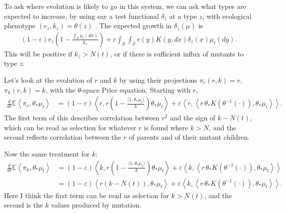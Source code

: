 \documentclass[11pt]{amsart}
\theoremstyle{remark}
\theoremstyle{definition}
\begin{document}
To ask where evolution is likely to go in this system, we can ask what types
are expected to increase, by using say a test functional $\delta_z$
at a type $z$,
with ecological phenotype $(r_z,k_z)=\theta(z)$%
.
The expected growth in $\delta_z(\mu)$ is
\begin{align*}
	(1-\varepsilon) r_z \left( 1 - \frac{\int_{\mathcal{S}} \mu_t(dx)}{k_z} \right) + \varepsilon \int_{\mathcal{S}}\int_{\mathcal{S}}  r(y) K(y,dx) \delta_z(x) \mu_t(dy).
\end{align*}
This will be positive if $k_z>N(t)$,
or if there is sufficient influx of mutants to type $z$.

Let's look at the evolution of $r$ and $k$ by using their projections
$\pi_r(r,k)=r$, $\pi_k(r,k)=k$, with the $\theta$-space Price equation.
Starting with $r$,
\begin{align*}
	\frac{d}{dt}\mathbb{E}\left\langle \pi_r, \theta_{*}\mu_t \right\rangle
	&= (1-\varepsilon) \left\langle r, r \left( 1 - \frac{\langle 1, \theta_*{\mu_t}\rangle}{k} \right) \theta_*\mu_t \right\rangle 
		+ \varepsilon \left\langle r, \left\langle r\,\theta_*K(\theta^{-1}(\cdot)), \theta_{*}\mu_t \right\rangle \right\rangle.
\end{align*}
The first term of this describes correlation between $r^2$ and the
sign of $k-N(t)$,
which can be read as selection for whatever $r$ is found where $k>N$,
and the second reflects correlation between the $r$ of 
parents and of their mutant children.

Now the same treatment for $k$:
\begin{align*}
	\frac{d}{dt}\mathbb{E}\left\langle \pi_k, \theta_{*}\mu_t \right\rangle
	&= (1-\varepsilon) \left\langle k, r \left( 1 - \frac{\langle 1, \theta_*{\mu_t}\rangle}{k} \right) \theta_*\mu_t \right\rangle 
		+ \varepsilon \left\langle k, \left\langle r\,\theta_*K(\theta^{-1}(\cdot)), \theta_{*}\mu_t \right\rangle \right\rangle \\
	&= (1-\varepsilon) \left\langle r ( k - N(t) ), \theta_*\mu_t \right\rangle 
		+ \varepsilon \left\langle k, \left\langle r\,\theta_*K(\theta^{-1}(\cdot)), \theta_{*}\mu_t \right\rangle \right\rangle .
\end{align*}
Here I think the first term can be read as selection for $k>N(t)$,
and the second is the $k$ values produced by mutation.
\end{document}

